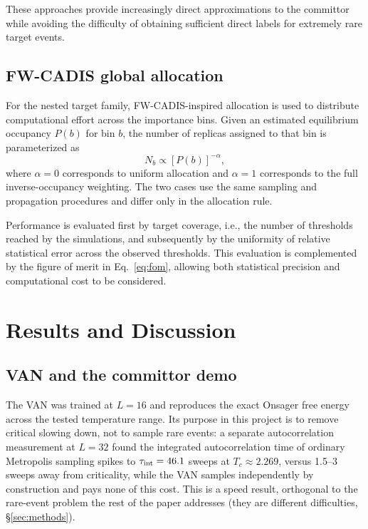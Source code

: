 \documentclass[a4paper,fleqn]{cas-sc}
\let\Oldsubsection\subsection
\renewcommand{\subsection}{\FloatBarrier\Oldsubsection}
\begin{document}
	These approaches provide increasingly direct approximations to the committor while avoiding the difficulty of obtaining sufficient direct labels for extremely rare target events.
	
	\subsection{FW-CADIS global allocation}\label{sec:fwcadis-method}
	
	For the nested target family, FW-CADIS-inspired allocation is used to distribute computational effort across the importance bins. Given an estimated equilibrium occupancy $P(b)$ for bin $b$, the number of replicas assigned to that bin is parameterized as
	\begin{equation}
		N_b\propto [P(b)]^{-\alpha},
	\end{equation}
	where $\alpha=0$ corresponds to uniform allocation and $\alpha=1$ corresponds to the full inverse-occupancy weighting. The two cases use the same sampling and propagation procedures and differ only in the allocation rule.
	
	Performance is evaluated first by target coverage, i.e., the number of thresholds reached by the simulations, and subsequently by the uniformity of relative statistical error across the observed thresholds. This evaluation is complemented by the figure of merit in Eq.~\eqref{eq:fom}, allowing both statistical precision and computational cost to be considered.
	
	
	\FloatBarrier
	
	
	\section{Results and Discussion}\label{sec:results}
	
	\subsection{VAN and the committor demo}\label{sec:res-van}
	The VAN was trained at $L=16$ and reproduces the exact Onsager free energy across the
	tested temperature range. Its purpose in this project is to remove critical slowing down,
	not to sample rare events: a separate autocorrelation measurement at $L=32$ found the
	integrated autocorrelation time of ordinary Metropolis sampling spikes to $\tau_{\rm
		int}=46.1$ sweeps at $T_c\approx2.269$, versus 1.5--3 sweeps away from criticality, while
	the VAN samples independently by construction and pays none of this cost. This is a speed
	result, orthogonal to the rare-event problem the rest of the paper addresses (they are
	different difficulties, \S\ref{sec:methods}).
	
\end{document}
